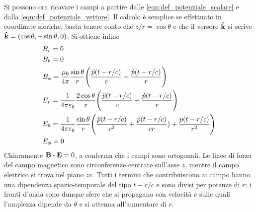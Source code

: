 Si possono ora ricavare i campi a partire dalle \eqref{eqn:def_potenziale_scalare} e dalla
\eqref{eqn:def_potenziale_vettore}. Il calcolo è semplice se effettuato in coordinate sferiche, basta tenere
conto che $z/r=\cos{\theta}$ e che il versore $\vu{k}$ si scrive $\vu{k}=(\cos{\theta},-\sin{\theta},0)$.
Si ottiene infine
\[
    \begin{split}
        & B_r=0 \\
        & B_\theta=0 \\
        & B_\phi=\frac{\mu_0}{4\pi}\frac{\sin{\theta}}{r} \Biggl(\frac{\ddot{p}(t-r/c)}{c}+\frac{\dot{p}(t-r/c)}{r}\Biggr) \\
        & E_r=\frac{1}{4\pi\varepsilon_0}\frac{2\cos{\theta}}{r} \Biggl(\frac{\ddot{p}(t-r/c)}{c}+\frac{\dot{p}(t-r/c)}{r}\Biggr) \\
        & E_\theta=\frac{1}{4\pi\varepsilon_0}\frac{\sin{\theta}}{r} \Biggl(\frac{\ddot{p}(t-r/c)}{c^2}+\frac{\dot{p}(t-r/c)}{cr})+
        \frac{p(t-r/c)}{r^2}\Biggr) \\
        & E_\phi=0
    \end{split}
\]
Chiaramente $\vb{B}\vdot\vb{E}=0$, a conferma che i campi sono ortogonali. Le linee di forza del campo magnetico
sono circonferenze centrate sull'asse $z$, mentre il campo elettrico si trova nel piano $zr$. Tutti i termini che
contribuiscono ai campo hanno una dipendenza spazio-temporale del tipo $t-r/c$ e sono divisi per potenze di $r$:
i fronti d'onda sono dunque sfere che si propagano con velocità $c$ sulle quali l'ampiezza dipende da $\theta$
e si attenua all'aumentare di $r$.

